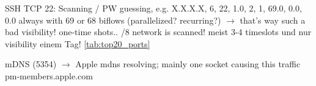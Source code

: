 SSH TCP 22: Scanning / PW guessing, e.g. X.X.X.X, 6, 22, 1.0, 2, 1, 69.0, 0.0, 0.0 always with 69 or 68 biflows (parallelized? recurring?) $\rightarrow$ that's way such a bad visibility! one-time shots.. /8 network is scanned! meist 3-4 timeslots und nur visibility einem Tag! \ref{tab:top20_ports}

mDNS (5354) $\rightarrow$ Apple mdns resolving; mainly one socket causing this traffic pm-members.apple.com
